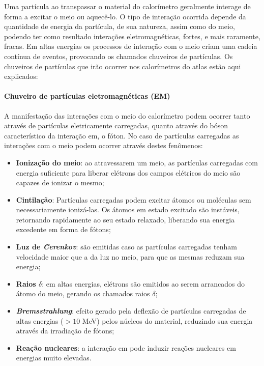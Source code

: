 Uma partícula ao transpassar o material do calorímetro geralmente interage de
forma a excitar o meio ou aquecê-lo. O tipo de interação ocorrida depende da
quantidade de energia da partícula, de sua natureza, assim como do
meio, podendo ter como resultado interações eletromagnéticas, fortes, e mais 
raramente, fracas. Em altas energias os processos de interação com o meio 
criam uma cadeia contínua de eventos, provocando os chamados chuveiros de partículas. 
Os chuveiros de partículas que irão ocorrer nos calorímetros do \gls{atlas} 
estão aqui explicados:

\paragraph{Chuveiro de partículas eletromagnéticas (EM)}
\label{par:chuveiro_em}

A manifestação das interações  com o meio do calorímetro 
podem ocorrer tanto através de partículas eletricamente carregadas, 
quanto através do bóson característico da interação
\gls{em}, o fóton. No caso de partículas carregadas 
as interações com o meio podem ocorrer através destes fenômenos:

\begin{itemize}
\item \textbf{Ionização do meio}: ao atravessarem um meio, as partículas
carregadas com energia suficiente para liberar elétrons dos campos elétricos do
meio são capazes de ionizar o mesmo;
\item \textbf{Cintilação}: Partículas carregadas podem excitar átomos ou
moléculas sem necessariamente ionizá-las. Os átomos em estado excitado são
instáveis, retornando rapidamente ao seu estado relaxado, liberando sua energia
excedente em forma de fótons;
\item \textbf{Luz de \emph{\~Cerenkov}}: são emitidas caso as partículas carregadas tenham
velocidade maior que a da luz no meio, para que as mesmas reduzam sua energia;
\item \textbf{Raios $\delta$}: em altas energias, elétrons são emitidos ao serem
arrancados do átomo do meio, gerando os chamados raios $\delta$;
\item \textbf{\emph{Bremsstrahlung}}: efeito gerado pela deflexão de partículas
carregadas de altas energias ($>10$ MeV) pelos núcleos do material, reduzindo sua energia 
através da irradiação de fótons;
\item \textbf{Reação nucleares}: a interação \gls{em} pode induzir
reações nucleares em energias muito elevadas.
\end{itemize}


